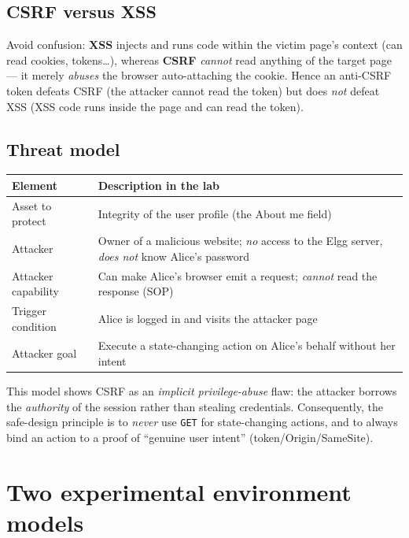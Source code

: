 \documentclass[11pt,a4paper]{article}
\begin{document}
\subsection{CSRF versus XSS}
Avoid confusion: \textbf{XSS} injects and runs code within the victim page's context (can read cookies, tokens\ldots), whereas \textbf{CSRF} \emph{cannot} read anything of the target page — it merely \emph{abuses} the browser auto-attaching the cookie. Hence an anti-CSRF token defeats CSRF (the attacker cannot read the token) but does \emph{not} defeat XSS (XSS code runs inside the page and can read the token).

\subsection{Threat model}
\begin{center}\small
\begin{tabularx}{\linewidth}{@{}l Y@{}}
\toprule
\textbf{Element} & \textbf{Description in the lab}\\
\midrule
Asset to protect & Integrity of the user profile (the About me field)\\
Attacker & Owner of a malicious website; \emph{no} access to the Elgg server, \emph{does not} know Alice's password\\
Attacker capability & Can make Alice's browser emit a request; \emph{cannot} read the response (SOP)\\
Trigger condition & Alice is logged in and visits the attacker page\\
Attacker goal & Execute a state-changing action on Alice's behalf without her intent\\
\bottomrule
\end{tabularx}
\end{center}
\noindent This model shows CSRF as an \emph{implicit privilege-abuse} flaw: the attacker borrows the \emph{authority} of the session rather than stealing credentials. Consequently, the safe-design principle is to \emph{never} use \texttt{GET} for state-changing actions, and to always bind an action to a proof of ``genuine user intent'' (token/Origin/SameSite).

\section{Two experimental environment models}
\end{document}
